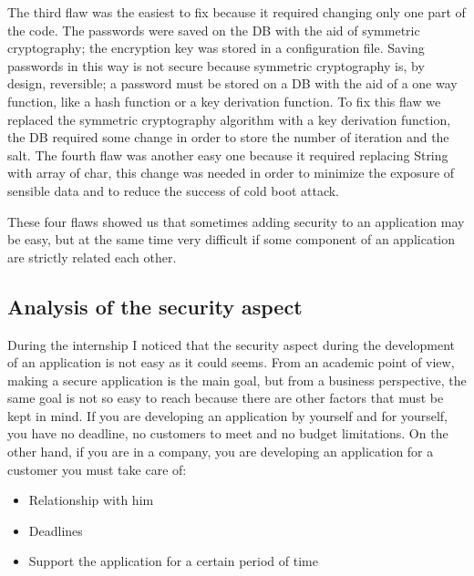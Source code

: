The third flaw was the easiest to fix because it required changing only one part of the code.\newline
The passwords were saved on the DB with the aid of symmetric cryptography; the encryption key was stored in a configuration file.\newline
Saving passwords in this way is not secure because symmetric cryptography is, by design, reversible; a password must be stored on a DB with the aid of a one way function, like a hash function or a key derivation function.\newline
To fix this flaw we replaced the symmetric cryptography algorithm with a key derivation function, the DB required some change in order to store the number of iteration and the salt.\newline
The fourth flaw was another easy one because it required replacing String with array of char, this change was needed in order to minimize the exposure of sensible data and to reduce the success of cold boot attack.\newline

These four flaws showed us that sometimes adding security to an application may be easy, but at the same time very difficult if some component of an application are strictly related each other.

\subsection{Analysis of the security aspect}
During the internship I noticed that the security aspect during the development of an application is not easy as it could seems.\newline
From an academic point of view, making a secure application is the main goal, but from a business perspective, the same goal is not so easy to reach because there are other factors that must be kept in mind.\newline
If you are developing an application by yourself and for yourself, you have no deadline, no customers to meet and no budget limitations.\newline
On the other hand, if you are in a company, you are developing an application for a customer you must take care of:
\begin{itemize}
	\item Relationship with him
	\item Deadlines
	\item Support the application for a certain period of time
\end{itemize}

